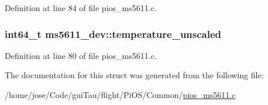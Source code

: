 Definition at line 84 of file pios\-\_\-ms5611.\-c.

\hypertarget{structms5611__dev_ae7a92929f9d2649ee5569f6f7b3227ed}{
\subsubsection[{temperature\-\_\-unscaled}]{\setlength{\rightskip}{0pt plus 5cm}int64\-\_\-t ms5611\-\_\-dev\-::temperature\-\_\-unscaled}}\label{structms5611__dev_ae7a92929f9d2649ee5569f6f7b3227ed}


Definition at line 80 of file pios\-\_\-ms5611.\-c.



The documentation for this struct was generated from the following file\-:\begin{DoxyCompactItemize}
\item 
/home/jose/\-Code/gui\-Tau/flight/\-Pi\-O\-S/\-Common/\hyperlink{pios__ms5611_8c}{pios\-\_\-ms5611.\-c}\end{DoxyCompactItemize}
